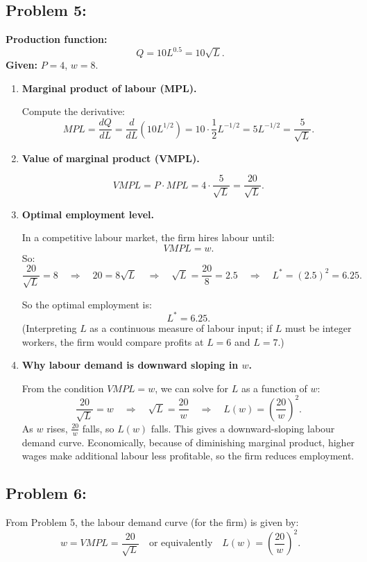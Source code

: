 \documentclass[12pt]{article}
\begin{document}
\subsection*{Problem 5: }

\textbf{Production function:}
\[
Q = 10L^{0.5} = 10\sqrt{L}.
\]
\textbf{Given:} $P=4$, $w=8$.

\begin{enumerate}
\item \textbf{Marginal product of labour (MPL).}

Compute the derivative:
\[
MPL = \frac{dQ}{dL} = \frac{d}{dL}\left(10L^{1/2}\right)
= 10 \cdot \frac{1}{2}L^{-1/2}
= 5L^{-1/2}
= \frac{5}{\sqrt{L}}.
\]

\item \textbf{Value of marginal product (VMPL).}

\[
VMPL = P \cdot MPL = 4 \cdot \frac{5}{\sqrt{L}} = \frac{20}{\sqrt{L}}.
\]

\item \textbf{Optimal employment level.}

In a competitive labour market, the firm hires labour until:
\[
VMPL = w.
\]
So:
\[
\frac{20}{\sqrt{L}} = 8
\quad \Rightarrow \quad
20 = 8\sqrt{L}
\quad \Rightarrow \quad
\sqrt{L} = \frac{20}{8} = 2.5
\quad \Rightarrow \quad
L^* = (2.5)^2 = 6.25.
\]

So the optimal employment is:
\[
L^* = 6.25.
\]
(Interpreting $L$ as a continuous measure of labour input; if $L$ must be integer workers, the firm would compare profits at $L=6$ and $L=7$.)

\item \textbf{Why labour demand is downward sloping in $w$.}

From the condition $VMPL=w$, we can solve for $L$ as a function of $w$:
\[
\frac{20}{\sqrt{L}} = w
\quad \Rightarrow \quad
\sqrt{L} = \frac{20}{w}
\quad \Rightarrow \quad
L(w) = \left(\frac{20}{w}\right)^2.
\]
As $w$ rises, $\frac{20}{w}$ falls, so $L(w)$ falls. This gives a downward-sloping labour demand curve.
Economically, because of diminishing marginal product, higher wages make additional labour less profitable, so the firm reduces employment.
\end{enumerate}

\subsection*{Problem 6: }

From Problem 5, the labour demand curve (for the firm) is given by:
\[
w = VMPL = \frac{20}{\sqrt{L}}
\quad \text{or equivalently} \quad
L(w) = \left(\frac{20}{w}\right)^2.
\]
\end{document}
